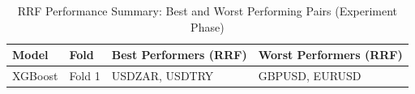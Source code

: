 \begin{table}[H] \centering \small
\caption{RRF Performance Summary: Best and Worst Performing Pairs (Experiment Phase)}
\label{tab:rrf_summary_experiment}
\begin{tabular}{l l p{5cm} p{5cm}}
\toprule
Model & Fold & Best Performers (RRF) & Worst Performers (RRF) \\
\midrule
XGBoost & Fold 1 & USDZAR, USDTRY & GBPUSD, EURUSD \\
\bottomrule
\end{tabular}
\end{table}
